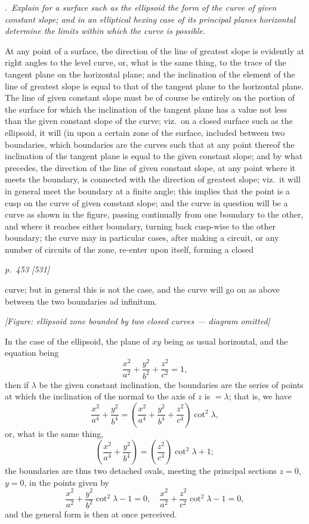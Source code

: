 \documentclass[11pt,a4paper]{book}
\begin{document}
\medskip
{}.\ \textit{Explain for a surface such as the ellipsoid the form of the curve of given
constant slope; and in an elliptical hexing case of its principal planes horizontal determine the limits within which the curve is possible.}

\medskip
At any point of a surface, the direction of the line of greatest slope is evidently
at right angles to the level curve, or, what is the same thing, to the trace of the
tangent plane on the horizontal plane; and the inclination of the element of the line
of greatest slope is equal to that of the tangent plane to the horizontal plane. The
line of given constant slope must be of course be entirely on the portion of the surface
for which the inclination of the tangent plane has a value not less than the given
constant slope of the curve; viz.\ on a closed surface such as the ellipsoid, it will (in
upon a certain zone of the surface, included between two boundaries, which boundaries
are the curves such that at any point thereof the inclination of the tangent plane is
equal to the given constant slope; and by what precedes, the direction of the line of
given constant slope, at any point where it meets the boundary, is connected with
the direction of greatest slope; viz.\ it will in general meet the boundary at a finite
angle; this implies that the point is a cusp on the curve of given constant slope;
and the curve in question will be a curve as shown in the figure, passing continually
from one boundary to the other, and where it reaches either boundary, turning back
cusp-wise to the other boundary; the curve may in particular cases, after making a
circuit, or any number of circuits of the zone, re-enter upon itself, forming a closed

\clearpage

\bigskip
\textit{p.~453 [531]}
\smallskip

\noindent
curve; but in general this is not the case, and the curve will go on as above between
the two boundaries ad infinitum.

\begin{center}
\textit{[Figure: ellipsoid zone bounded by two closed curves --- diagram omitted]}
\end{center}

In the case of the ellipsoid, the plane of $xy$ being as usual horizontal, and the
equation being
\[
\frac{x^2}{a^2} + \frac{y^2}{b^2} + \frac{z^2}{c^2} = 1,
\]
then if $\lambda$ be the given constant inclination, the boundaries are the series of points
at which the inclination of the normal to the axis of $z$ is $= \lambda$; that is, we have
\[
\frac{x^2}{a^4} + \frac{y^2}{b^4} = \left(\frac{x^2}{a^4} + \frac{y^2}{b^4} + \frac{z^2}{c^4}\right)\cot^2\lambda,
\]
or, what is the same thing,
\[
\left(\frac{x^2}{a^4} + \frac{y^2}{b^4}\right) = \left(\frac{z^2}{c^4}\right)\cot^2\lambda + 1;
\]
the boundaries are thus two detached ovals, meeting the principal sections $z = 0$, $y = 0$,
in the points given by
\[
\frac{x^2}{a^2} + \frac{y^2}{b^2}\cot^2\lambda - 1 = 0, \quad \frac{x^2}{a^2} + \frac{z^2}{c^2}\cot^2\lambda - 1 = 0,
\]
and the general form is then at once perceived.
\end{document}
